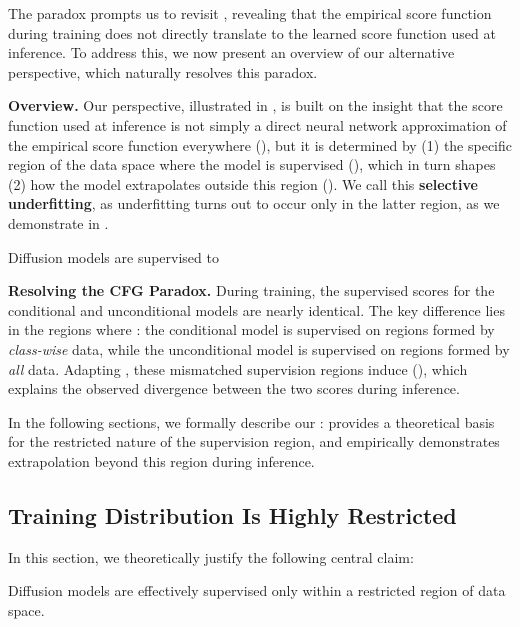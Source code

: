 The paradox prompts us to revisit \common, revealing that the empirical score function during training does not directly translate to the learned score function used at inference. To address this, we now present an overview of our alternative perspective, which naturally resolves this paradox.

\textbf{Overview.} Our perspective, illustrated in , is built on the insight that the score function used at inference is not simply a direct neural network approximation of the empirical score function everywhere (\common), but it is determined by (1) the specific region of the data space where the model is supervised (), which in turn shapes (2) how the model extrapolates outside this region (). We call this \textbf{selective underfitting}, as underfitting turns out to occur only in the latter region, as we demonstrate in .
\begin{perspective}[Ours] \label{perspective:ours}
  Diffusion models are supervised to  \textbf{ }
\end{perspective}
\newcommand{\ours}{\Cref{perspective:ours}\xspace}

\textbf{Resolving the CFG Paradox.} 
During training, the supervised scores for the conditional and unconditional models are nearly identical. The key difference lies in the regions where : the conditional model is supervised on regions formed by \emph{class-wise} data, while the unconditional model is supervised on regions formed by \emph{all} data. Adapting \ours, these mismatched supervision regions induce  (), which explains the observed divergence between the two scores during inference.


In the following sections, we formally describe our \ours:  provides a theoretical basis for the restricted nature of the supervision region, and  empirically demonstrates extrapolation beyond this region during inference.

\subsection{Training Distribution Is Highly Restricted}
\label{sec:training-region}
In this section, we theoretically justify the following central claim: 
\begin{claim} \label{claim:one}
Diffusion models are effectively supervised only within a restricted region of data space.
\end{claim}

